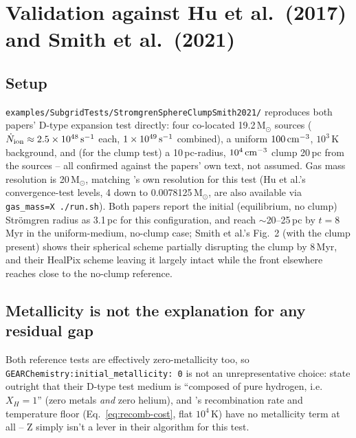 \section{Validation against Hu et al.\ (2017) and Smith et al.\ (2021)}
\label{sec:validation}

\subsection{Setup}

\texttt{examples/SubgridTests/StromgrenSphereClumpSmith2021/} reproduces
both papers' D-type expansion test directly: four co-located
19.2\,M$_\odot$ sources ($\dot N_{\rm ion}\approx2.5\times10^{48}\,
{\rm s^{-1}}$ each, $1\times10^{49}\,{\rm s^{-1}}$ combined), a uniform
$100\,{\rm cm^{-3}}$, $10^3\,$K background, and (for the clump test) a
10\,pc-radius, $10^4\,{\rm cm^{-3}}$ clump 20\,pc from the sources --
all confirmed against the papers' own text, not assumed. Gas mass
resolution is 20\,M$_\odot$, matching \citet{Smith2021}'s own
resolution for this test (Hu et al.'s convergence-test levels, 4 down
to 0.0078125\,M$_\odot$, are also available via \texttt{gas\_mass=X
./run.sh}). Both papers report the initial (equilibrium, no clump)
Str\"omgren radius as 3.1\,pc for this configuration, and reach
$\sim$20--25\,pc by $t=8\,$Myr in the uniform-medium, no-clump case;
Smith et al.'s Fig.~2 (with the clump present) shows their spherical
scheme partially disrupting the clump by 8\,Myr, and their HealPix
scheme leaving it largely intact while the front elsewhere reaches
close to the no-clump reference.

\subsection{Metallicity is not the explanation for any residual gap}
\label{sec:metallicity}

Both reference tests are effectively zero-metallicity too, so
\texttt{GEARChemistry:initial\_metallicity: 0} is not an
unrepresentative choice: \citet{Hu2017} state outright that their
D-type test medium is ``composed of pure hydrogen, i.e.\ $X_H=1$''
(zero metals \emph{and} zero helium), and \citet{Smith2021}'s
recombination rate and temperature floor (Eq.~\ref{eq:recomb-cost},
flat $10^4\,$K) have no metallicity term at all -- Z simply isn't a
lever in their algorithm for this test.


